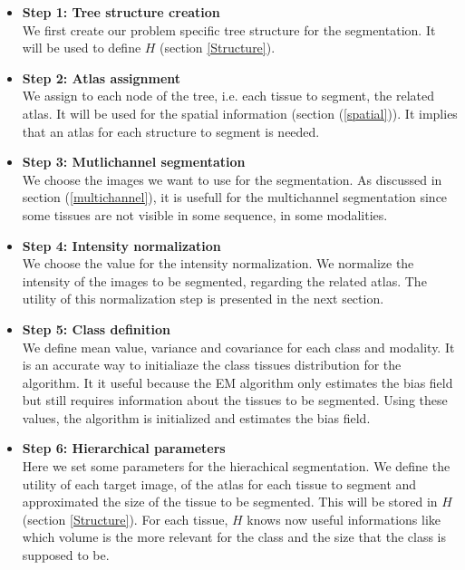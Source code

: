 \begin{itemize}
\item \textbf{Step 1: Tree structure creation}\\
\hspace*{4 mm}We first create our problem specific tree structure for the segmentation. It will be used to define $H$ (section \ref{Structure}).
%
\item \textbf{Step 2: Atlas assignment}\\
\hspace*{4 mm}We assign to each node of the tree, i.e. each tissue to segment, the related atlas. It will be used for the spatial information (section (\ref{spatial})). It implies that an atlas for each structure to segment is needed.
%
\item \textbf{Step 3: Mutlichannel segmentation}\\
\hspace*{4 mm}We choose the images we want to use for the segmentation. As discussed in section (\ref{multichannel}), it is usefull for the multichannel segmentation since some tissues are not visible in some sequence, in some modalities.
%
\item \textbf{Step 4: Intensity normalization}\\
\hspace*{4 mm}We choose the value for the intensity normalization. We normalize the intensity of the images to be segmented, regarding the related atlas. The utility of this normalization step is presented in the next section.
%
\item \textbf{Step 5: Class definition}\\
\hspace*{4 mm}We define mean value, variance and covariance for each class and modality. It is an accurate way to initialiaze the class tissues distribution for the algorithm. It it useful because the EM algorithm only estimates the bias field but still requires information about the tissues to be segmented. Using these values, the algorithm is initialized and estimates the bias field.
%
\item \textbf{Step 6: Hierarchical parameters}\\
\hspace*{4 mm}Here we set some parameters for the hierachical segmentation. We define the utility of each target image, of the atlas for each tissue to segment and approximated the size of the tissue to be segmented. This will be stored in $H$ (section \ref{Structure}). For each tissue, $H$ knows now useful informations like which volume is the more relevant  for the class and the size that the class is supposed to be.

\end{itemize}
